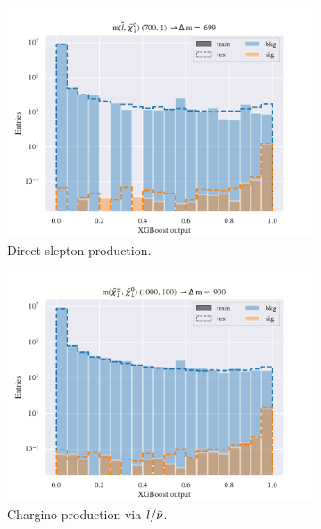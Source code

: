\begin{figure}[H]
    \centering
    \begin{subfigure}[t!]{0.49\textwidth}
        \includegraphics[width = \textwidth]{Figures/SlepSlep/ML/BDT/Low_level/High/scaled_train_test_396033.pdf}
        \caption{Direct slepton production.}
        \label{fig:}
    \end{subfigure}
    \begin{subfigure}[t!]{0.49\textwidth}
        \includegraphics[width = \textwidth]{Figures/SlepSnu/BDT/Low_level/High/scaled_train_test_397169.pdf}
        \caption{Chargino production via $\Tilde{l}/\Tilde{\nu}$.}
        \label{fig:}
    \end{subfigure}
    \begin{subfigure}[t!]{0.49\textwidth}

\end{subfigure}
\end{figure}
